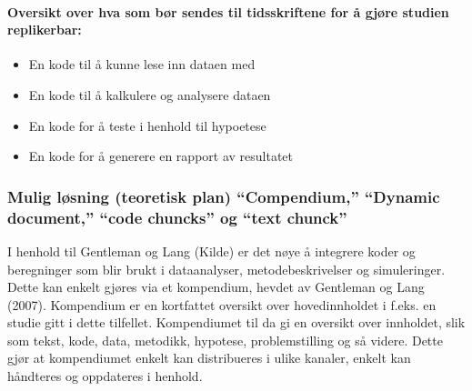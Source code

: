 \documentclass[
  12pt,
]{article}
\providecommand{\tightlist}{%
  \setlength{\itemsep}{0pt}\setlength{\parskip}{0pt}}
\begin{document}
\hypertarget{oversikt-over-hva-som-buxf8r-sendes-til-tidsskriftene-for-uxe5-gjuxf8re-studien-replikerbar}{%
\paragraph{Oversikt over hva som bør sendes til tidsskriftene for å
gjøre studien
replikerbar:}\label{oversikt-over-hva-som-buxf8r-sendes-til-tidsskriftene-for-uxe5-gjuxf8re-studien-replikerbar}}

\begin{itemize}
\tightlist
\item
  En kode til å kunne lese inn dataen med
\item
  En kode til å kalkulere og analysere dataen
\item
  En kode for å teste i henhold til hypoetese
\item
  En kode for å generere en rapport av resultatet
\end{itemize}

\hypertarget{mulig-luxf8sning-teoretisk-plan-compendium-dynamic-document-code-chuncks-og-text-chunck}{%
\subsubsection{Mulig løsning (teoretisk plan) ``Compendium,'' ``Dynamic
document,'' ``code chuncks'' og ``text
chunck''}\label{mulig-luxf8sning-teoretisk-plan-compendium-dynamic-document-code-chuncks-og-text-chunck}}

I henhold til Gentleman og Lang (Kilde) er det nøye å integrere koder og
beregninger som blir brukt i dataanalyser, metodebeskrivelser og
simuleringer. Dette kan enkelt gjøres via et kompendium, hevdet av
Gentleman og Lang (2007). Kompendium er en kortfattet oversikt over
hovedinnholdet i f.eks. en studie gitt i dette tilfellet. Kompendiumet
til da gi en oversikt over innholdet, slik som tekst, kode, data,
metodikk, hypotese, problemstilling og så videre. Dette gjør at
kompendiumet enkelt kan distribueres i ulike kanaler, enkelt kan
håndteres og oppdateres i henhold.
\end{document}
